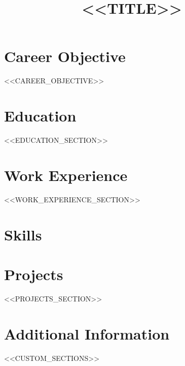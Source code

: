 \documentclass[11pt,a4paper,sans]{moderncv}
\title{<<TITLE>>}
\begin{document}
\makecvtitle

\section{Career Objective}
<<CAREER_OBJECTIVE>>

\section{Education}
<<EDUCATION_SECTION>>

\section{Work Experience}
<<WORK_EXPERIENCE_SECTION>>

\section{Skills}

\section{Projects}
<<PROJECTS_SECTION>>

\section{Additional Information}

<<CUSTOM_SECTIONS>>
\end{document}
